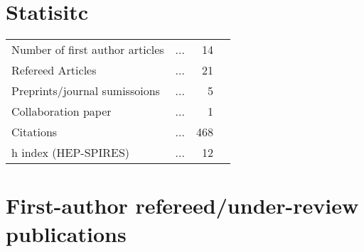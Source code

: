 \documentclass[10pt,floatfix,a4paper]{article}
\begin{document}
\section*{Statisitc}
\begin{tabular}{ l l r l}
	Number of first author articles 	& ... & 14  \\
	Refereed Articles 					& ... & 21  \\
	Preprints/journal sumissoions 		& ... & 5   \\
	Collaboration paper			 		& ... & 1   \\
	Citations 							& ... & 468 \\
	h index (HEP-SPIRES) 				& ... & 12  \\
\end{tabular}

\section*{First-author refereed/under-review publications}
\end{document}
